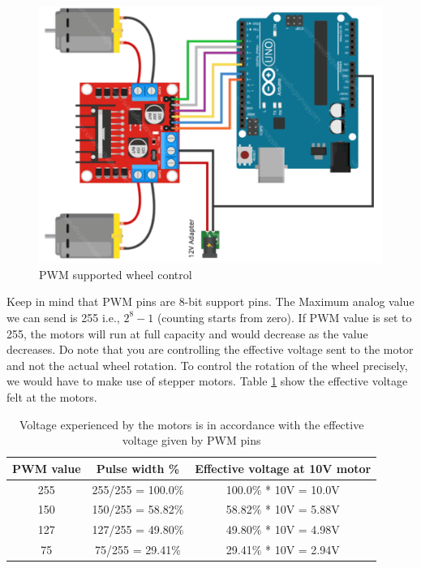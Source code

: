 \begin{figure}
    \centering
    \includegraphics[width=\textwidth]{Images/Motor_Driver/speed_bot.png}
    \caption{PWM supported wheel control}
    \label{fig:speed_controlled}
\end{figure}

Keep in mind that \ac{PWM} pins are 8-bit support pins. The Maximum analog value we can send is 255 i.e., $ 2^8 - 1 $ (counting starts from zero). If \ac{PWM} value is set to 255, the motors will run at full capacity and would decrease as the value decreases. Do note that you are controlling the effective voltage sent to the motor and not the actual wheel rotation. To control the rotation of the wheel precisely, we would have to make use of stepper motors. Table \ref{fig:motor_volt} show the effective voltage felt at the motors. %


\begin{table}
    \centering
    \renewcommand{\arraystretch}{1.5}
    \begin{tabular}{|c|c|c|}
    \hline
        \textbf{PWM value} & \textbf{Pulse width \%} & \textbf{Effective voltage at 10V motor} \\ \hline
        255 & 255/255 = 100.0\% & 100.0\% * 10V = 10.0V \\ \hline
        150 & 150/255 = 58.82\% & 58.82\% * 10V = 5.88V \\ \hline
        127 & 127/255 = 49.80\% & 49.80\% * 10V = 4.98V \\ \hline
        75 & 75/255 = 29.41\% & 29.41\% * 10V = 2.94V \\ \hline
    \end{tabular}
    \caption[Voltage at motors]{Voltage experienced by the motors is in accordance with the effective voltage given by \ac{PWM} pins}
    \label{fig:motor_volt}
\end{table}
\renewcommand{\arraystretch}{1}


